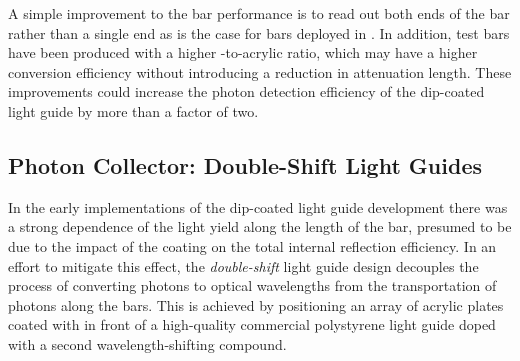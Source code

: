 

 A simple improvement to the bar performance is to read out both ends of the bar rather than a single end as is the case for bars deployed in .  
In addition, test bars have been produced with a higher -to-acrylic ratio, which may have a higher conversion efficiency without introducing a reduction in attenuation length. These improvements could increase the photon detection efficiency of the dip-coated light guide by more than a factor of two.

\subsection{Photon Collector: Double-Shift Light Guides}
\label{ssec:fdsp-pd-pc-bar2}

In the early implementations of the dip-coated light guide development there was a strong dependence of the light yield along the length of the bar, presumed to be due to the impact of the coating on the total internal reflection efficiency.  In an effort to mitigate this effect, the \textit{double-shift} light guide design decouples the process of converting  photons to optical
wavelengths from the transportation of photons along the bars. This is achieved by positioning an array of acrylic plates coated with  in front of a high-quality commercial polystyrene light guide doped with a second wavelength-shifting compound.


